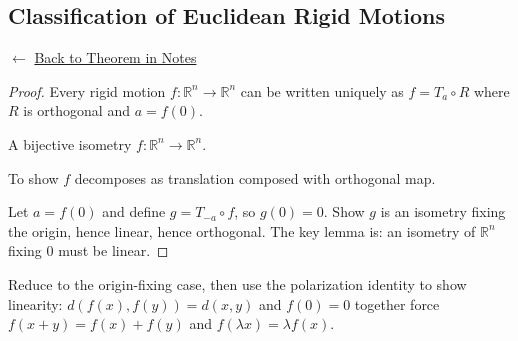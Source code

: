 

\subsection*{Classification of Euclidean Rigid Motions}
\label{prf:classification-rigid-motions}

\begin{remark*}[Return]
$\leftarrow$ \hyperref[thm:classification-rigid-motions]{Back to Theorem in Notes}
\end{remark*}

\begin{proof}
\Claim Every rigid motion $f : \mathbb{R}^n \to \mathbb{R}^n$ can be written
uniquely as $f = T_a \circ R$ where $R$ is orthogonal and $a = f(0)$.

\Given A bijective isometry $f : \mathbb{R}^n \to \mathbb{R}^n$.

\Goal To show $f$ decomposes as translation composed with orthogonal map.

\Strategy Let $a = f(0)$ and define $g = T_{-a} \circ f$, so $g(0) = 0$.
Show $g$ is an isometry fixing the origin, hence linear, hence orthogonal.
The key lemma is: an isometry of $\mathbb{R}^n$ fixing $0$ must be linear.


\end{proof}

\begin{remark*}
Reduce to the origin-fixing case, then use the polarization identity
to show linearity: $d(f(x), f(y)) = d(x,y)$ and $f(0) = 0$ together
force $f(x+y) = f(x) + f(y)$ and $f(\lambda x) = \lambda f(x)$.
\end{remark*}

